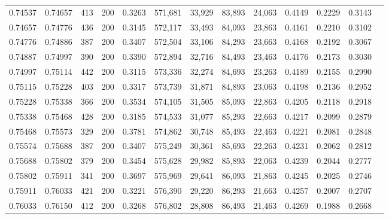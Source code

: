 \begin{tabular}{rrrrrrrrrrrrr}
0.74537 & 0.74657 &   413 & 200 &                                     0.3263 & 571,681 &  33,929 &  83,893 &  24,063 & 0.4149 & 0.2229 & 0.3143 \\
0.74657 & 0.74776 &   436 & 200 &                                     0.3145 & 572,117 &  33,493 &  84,093 &  23,863 & 0.4161 & 0.2210 & 0.3102 \\
0.74776 & 0.74886 &   387 & 200 &                                     0.3407 & 572,504 &  33,106 &  84,293 &  23,663 & 0.4168 & 0.2192 & 0.3067 \\
0.74887 & 0.74997 &   390 & 200 &                                     0.3390 & 572,894 &  32,716 &  84,493 &  23,463 & 0.4176 & 0.2173 & 0.3030 \\
0.74997 & 0.75114 &   442 & 200 &                                     0.3115 & 573,336 &  32,274 &  84,693 &  23,263 & 0.4189 & 0.2155 & 0.2990 \\
0.75115 & 0.75228 &   403 & 200 &                                     0.3317 & 573,739 &  31,871 &  84,893 &  23,063 & 0.4198 & 0.2136 & 0.2952 \\
0.75228 & 0.75338 &   366 & 200 &                                     0.3534 & 574,105 &  31,505 &  85,093 &  22,863 & 0.4205 & 0.2118 & 0.2918 \\
0.75338 & 0.75468 &   428 & 200 &                                     0.3185 & 574,533 &  31,077 &  85,293 &  22,663 & 0.4217 & 0.2099 & 0.2879 \\
0.75468 & 0.75573 &   329 & 200 &                                     0.3781 & 574,862 &  30,748 &  85,493 &  22,463 & 0.4221 & 0.2081 & 0.2848 \\
0.75574 & 0.75688 &   387 & 200 &                                     0.3407 & 575,249 &  30,361 &  85,693 &  22,263 & 0.4231 & 0.2062 & 0.2812 \\
0.75688 & 0.75802 &   379 & 200 &                                     0.3454 & 575,628 &  29,982 &  85,893 &  22,063 & 0.4239 & 0.2044 & 0.2777 \\
0.75802 & 0.75911 &   341 & 200 &                                     0.3697 & 575,969 &  29,641 &  86,093 &  21,863 & 0.4245 & 0.2025 & 0.2746 \\
0.75911 & 0.76033 &   421 & 200 &                                     0.3221 & 576,390 &  29,220 &  86,293 &  21,663 & 0.4257 & 0.2007 & 0.2707 \\
0.76033 & 0.76150 &   412 & 200 &                                     0.3268 & 576,802 &  28,808 &  86,493 &  21,463 & 0.4269 & 0.1988 & 0.2668 \\

\end{tabular}
